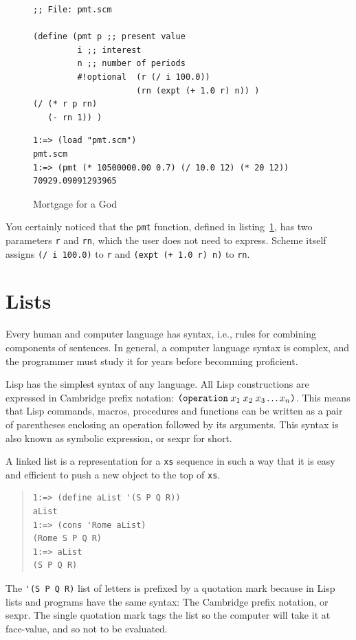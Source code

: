 \documentclass[a4paper,12pt]{book}
\newenvironment{fmpage}[1]
           {\begin{lrbox}{\fmbox}\begin{minipage}{#1}}
           {\end{minipage}\end{lrbox}\fbox{\usebox{\fmbox}}}
\begin{document}
\begin{figure}[!h]
\begin{fmpage}{0.9\textwidth}
\begin{verbatim}
;; File: pmt.scm

(define (pmt p ;; present value
         i ;; interest 
         n ;; number of periods
         #!optional  (r (/ i 100.0)) 
                     (rn (expt (+ 1.0 r) n)) )
(/ (* r p rn)
   (- rn 1)) )
\end{verbatim}
\end{fmpage}

\begin{fmpage}{0.9\textwidth}
\begin{verbatim}
1:=> (load "pmt.scm")
pmt.scm
1:=> (pmt (* 10500000.00 0.7) (/ 10.0 12) (* 20 12))
70929.09091293965
\end{verbatim}
\end{fmpage}
\caption{Mortgage for a God}
\label{Pan:mortgage}
\end{figure}

You certainly noticed that the
\verb|pmt| function, defined
in listing~\ref{Pan:mortgage},
has two parameters \verb|r| and \verb|rn|,
which the user does not need
to express. Scheme itself
assigns \verb|(/ i 100.0)| to \verb|r|
and \verb|(expt (+ 1.0 r) n)| to \verb|rn|.

\section{Lists}
Every human and computer language
has syntax, i.e., rules for combining
components of sentences.
In general, a computer language
syntax is complex, and the programmer
must study it for years before
becomming proficient.

Lisp  has the simplest syntax
of any language. All
Lisp constructions are expressed
in Cambridge prefix notation:
$\verb|(operation|\;x_1\;x_2\;x_3\ldots x_n\verb|)|$.
This means that Lisp commands,
macros, procedures and functions
can be written  as a pair of parentheses
enclosing an operation followed
by its arguments. This syntax is also known
as symbolic expression, or sexpr for short.

A linked list is a representation for
a \verb|xs| sequence  in such a way
that it is easy and efficient to
push a new object to the top of \verb|xs|.
\begin{quote}
\begin{verbatim}
1:=> (define aList '(S P Q R))
aList
1:=> (cons 'Rome aList)
(Rome S P Q R)
1:=> aList
(S P Q R)
\end{verbatim}
\end{quote}
The \verb|'(S P Q R)| list of letters
is prefixed by a quotation mark because
in Lisp lists and programs have the
same syntax: The Cambridge prefix notation,
or sexpr.
The single quotation mark
tags the list so the computer will
take it at face-value, and so not to be evaluated.
\end{document}
